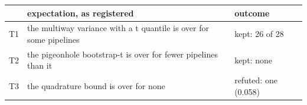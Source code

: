 \begin{tabular}{@{}l p{7.4cm} p{7.4cm}@{}}
\toprule
 & \textbf{expectation, as registered} & \textbf{outcome} \\
\midrule
T1 & the multiway variance with a t quantile is over for some pipelines & kept: 26 of 28 \\
T2 & the pigeonhole bootstrap-t is over for fewer pipelines than it & kept: none \\
T3 & the quadrature bound is over for none & refuted: one (0.058) \\
\bottomrule
\end{tabular}
